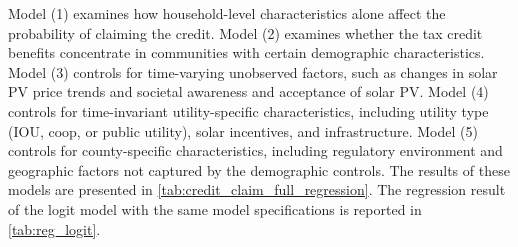 \documentclass[12pt,twoside,letterpaper]{article}
\begin{document}
Model (1) examines how household-level characteristics alone affect the probability of claiming the credit. Model (2) examines whether the tax credit benefits concentrate in communities with certain demographic characteristics. Model (3) controls for time-varying unobserved factors, such as changes in solar PV price trends and societal awareness and acceptance of solar PV. Model (4) controls for time-invariant utility-specific characteristics, including utility type (IOU, coop, or public utility), solar incentives, and infrastructure. Model (5) controls for county-specific characteristics, including regulatory environment and geographic factors not captured by the demographic controls. The results of these models are presented in \autoref{tab:credit_claim_full_regression}. The regression result of the logit model with the same model specifications is reported in \autoref{tab:reg_logit}.
\end{document}
